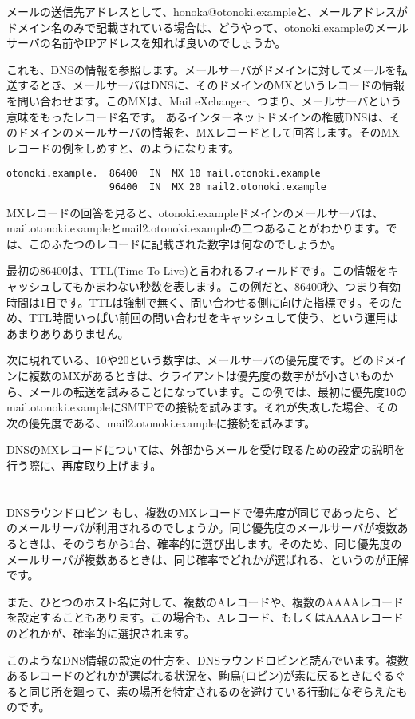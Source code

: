 メールの送信先アドレスとして、honoka@otonoki.exampleと、メールアドレスがドメイン名のみで記載されている場合は、どうやって、otonoki.exampleのメールサーバの名前やIPアドレスを知れば良いのでしょうか。

これも、DNSの情報を参照します。メールサーバがドメインに対してメールを転送するとき、メールサーバはDNSに、そのドメインのMXというレコードの情報を問い合わせます。このMXは、Mail eXchanger、つまり、メールサーバという意味をもったレコード名です。
あるインターネットドメインの権威DNSは、そのドメインのメールサーバの情報を、MXレコードとして回答します。そのMXレコードの例をしめすと、のようになります。

\begin{verbatim}
otonoki.example.  86400  IN  MX 10 mail.otonoki.example
                  96400  IN  MX 20 mail2.otonoki.example
\end{verbatim}

MXレコードの回答を見ると、otonoki.exampleドメインのメールサーバは、mail.otonoki.exampleとmail2.otonoki.exampleの二つあることがわかります。では、このふたつのレコードに記載された数字は何なのでしょうか。

最初の86400は、TTL(Time To Live)と言われるフィールドです。この情報をキャッシュしてもかまわない秒数を表します。この例だと、86400秒、つまり有効時間は1日です。TTLは強制で無く、問い合わせる側に向けた指標です。そのため、TTL時間いっぱい前回の問い合わせをキャッシュして使う、という運用はあまりありありません。

次に現れている、10や20という数字は、メールサーバの優先度です。どのドメインに複数のMXがあるときは、クライアントは優先度の数字がが小さいものから、メールの転送を試みることになっています。この例では、最初に優先度10のmail.otonoki.exampleにSMTPでの接続を試みます。それが失敗した場合、その次の優先度である、mail2.otonoki.exampleに接続を試みます。

DNSのMXレコードについては、外部からメールを受け取るための設定の説明を行う際に、再度取り上げます。

\section*{}
\begin{itembox}[l]{DNSラウンドロビン}
もし、複数のMXレコードで優先度が同じであったら、どのメールサーバが利用されるのでしょうか。同じ優先度のメールサーバが複数あるときは、そのうちから1台、確率的に選び出します。そのため、同じ優先度のメールサーバが複数あるときは、同じ確率でどれかが選ばれる、というのが正解です。

また、ひとつのホスト名に対して、複数のAレコードや、複数のAAAAレコードを設定することもあります。この場合も、Aレコード、もしくはAAAAレコードのどれかが、確率的に選択されます。

このようなDNS情報の設定の仕方を、DNSラウンドロビンと読んでいます。複数あるレコードのどれかが選ばれる状況を、駒鳥(ロビン)が素に戻るときにぐるぐると同じ所を廻って、素の場所を特定されるのを避けている行動になぞらえたものです。
\end{itembox}



